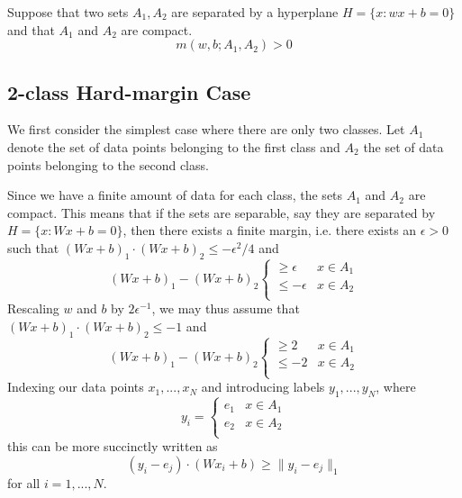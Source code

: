 \begin{lemma}
	Suppose that two sets $A_1, A_2$ are separated by a hyperplane
	$H=\{x:wx+b=0\}$ and that $A_1$ and $A_2$ are compact.
	\begin{equation}
	m(w,b; A_1, A_2) > 0
	\end{equation}
	
\end{lemma}

\subsection{2-class Hard-margin Case}
We first consider the simplest case where there are only two classes. Let $A_1$ denote the set of data points belonging to the
first class and $A_2$ the set of data points belonging to the second class. 

Since we have a finite amount of data for each class, the sets $A_1$ and $A_2$ are compact. This means that if the sets are
separable, say they are separated by $H=\{x:Wx+b=0\}$, then there exists a finite margin, i.e. there exists an $\epsilon > 0$
such that $(Wx+b)_1\cdot(Wx+b)_2\leq -\epsilon^2/4$ and
\begin{equation}
(Wx+b)_1 - (Wx+b)_2  \begin{cases} 
\geq \epsilon & x\in A_1 \\
\leq -\epsilon & x\in A_2 \\
\end{cases}
\end{equation}
Rescaling $w$ and $b$ by $2\epsilon^{-1}$, we may thus assume that $(Wx+b)_1\cdot(Wx+b)_2\leq -1$ and 
\begin{equation}
(Wx+b)_1 - (Wx+b)_2 \begin{cases} 
\geq 2 & x\in A_1 \\
\leq -2 & x\in A_2 \\
\end{cases}
\end{equation}
Indexing our data points $x_1,...,x_N$ and introducing labels $y_1,...,y_N$, where
\begin{equation}
y_i = \begin{cases} 
e_1 & x\in A_1 \\
e_2 & x\in A_2 \\
\end{cases}
\end{equation}
this can be more succinctly written as
\begin{equation}\label{separation_condition_2}
(y_i - e_j)\cdot (Wx_i+b) \geq \|y_i - e_j\|_1
\end{equation}
for all $i = 1,...,N$.


